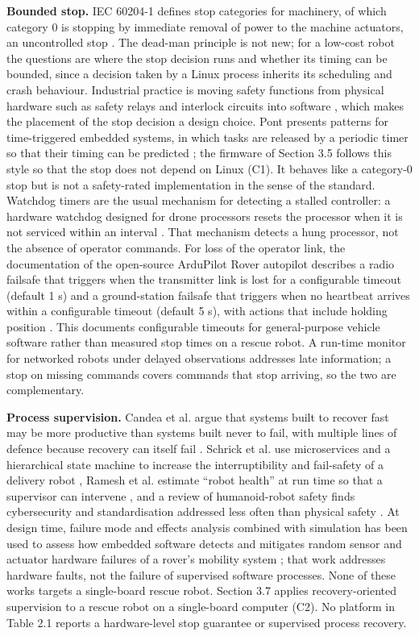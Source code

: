 \textbf{Bounded stop.} IEC 60204-1 defines stop categories for machinery, of which category 0 is stopping by immediate removal of power to the machine actuators, an uncontrolled stop \cite{iec60204}. The dead-man principle is not new; for a low-cost robot the questions are where the stop decision runs and whether its timing can be bounded, since a decision taken by a Linux process inherits its scheduling and crash behaviour. Industrial practice is moving safety functions from physical hardware such as safety relays and interlock circuits into software \cite{murray2022}, which makes the placement of the stop decision a design choice. Pont presents patterns for time-triggered embedded systems, in which tasks are released by a periodic timer so that their timing can be predicted \cite{pont2001}; the firmware of Section 3.5 follows this style so that the stop does not depend on Linux (C1). It behaves like a category-0 stop but is not a safety-rated implementation in the sense of the standard. Watchdog timers are the usual mechanism for detecting a stalled controller: a hardware watchdog designed for drone processors resets the processor when it is not serviced within an interval \cite{madhushankara2024}. That mechanism detects a hung processor, not the absence of operator commands. For loss of the operator link, the documentation of the open-source ArduPilot Rover autopilot describes a radio failsafe that triggers when the transmitter link is lost for a configurable timeout (default 1 s) and a ground-station failsafe that triggers when no heartbeat arrives within a configurable timeout (default 5 s), with actions that include holding position \cite{ardupilot_rover_failsafe}. This documents configurable timeouts for general-purpose vehicle software rather than measured stop times on a rescue robot. A run-time monitor for networked robots under delayed observations \cite{narasimhan2024} addresses late information; a stop on missing commands covers commands that stop arriving, so the two are complementary.

\textbf{Process supervision.} Candea et al. argue that systems built to recover fast may be more productive than systems built never to fail, with multiple lines of defence because recovery can itself fail \cite{candea2004}. Schrick et al. use microservices and a hierarchical state machine to increase the interruptibility and fail-safety of a delivery robot \cite{schrick2025}, Ramesh et al. estimate ``robot health'' at run time so that a supervisor can intervene \cite{ramesh2022}, and a review of humanoid-robot safety finds cybersecurity and standardisation addressed less often than physical safety \cite{koczi2025}. At design time, failure mode and effects analysis combined with simulation has been used to assess how embedded software detects and mitigates random sensor and actuator hardware failures of a rover's mobility system \cite{sini2022}; that work addresses hardware faults, not the failure of supervised software processes. None of these works targets a single-board rescue robot. Section 3.7 applies recovery-oriented supervision to a rescue robot on a single-board computer (C2). No platform in Table 2.1 reports a hardware-level stop guarantee or supervised process recovery.

